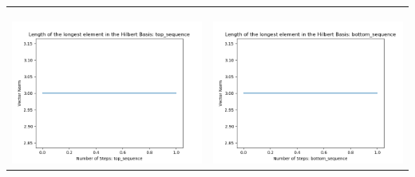 \documentclass[10pt]{article}
\begin{document}
\begin{tabular}{c|c}
\begin{minipage}{.45\textwidth}
\end{minipage} \\ \\
\hline \\\begin{minipage}{.45\textwidth}
\includegraphics[width=\textwidth]{"DATA/5d/6 generators 1 bound H/top_sequence LENGTH"}
\end{minipage} &
\begin{minipage}{.45\textwidth}
\includegraphics[width=\textwidth]{"DATA/5d/6 generators 1 bound H bottomup/bottom_sequence LENGTH"}
\end{minipage}
\end{tabular}
\end{document}
